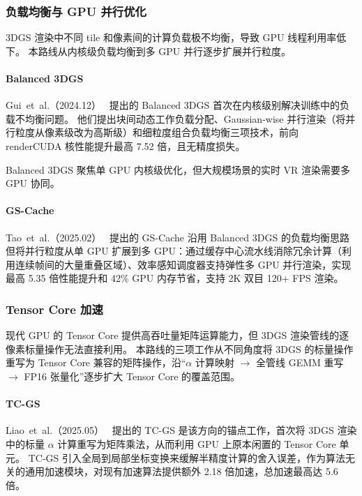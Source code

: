 \subsubsection{负载均衡与 GPU 并行优化}

3DGS 渲染中不同 tile 和像素间的计算负载极不均衡，导致 GPU 线程利用率低下。
本路线从内核级负载均衡到多 GPU 并行逐步扩展并行粒度。

\paragraph{Balanced 3DGS}
Gui~et~al.（2024.12）~\cite{2412_17378} 提出的 Balanced 3DGS 首次在内核级别解决训练中的负载不均衡问题。
他们提出块间动态工作负载分配、Gaussian-wise 并行渲染（将并行粒度从像素级改为高斯级）和细粒度组合负载均衡三项技术，前向 renderCUDA 核性能提升最高 7.52 倍，且无精度损失。

Balanced 3DGS 聚焦单 GPU 内核级优化，但大规模场景的实时 VR 渲染需要多 GPU 协同。
\paragraph{GS-Cache}

Tao~et~al.（2025.02）~\cite{2502_14938} 提出的 GS-Cache 沿用 Balanced 3DGS 的负载均衡思路但将并行粒度从单 GPU 扩展到多 GPU：通过缓存中心流水线消除冗余计算（利用连续帧间的大量重叠区域）、效率感知调度器支持弹性多 GPU 并行渲染，实现最高 5.35 倍性能提升和 42\% GPU 内存节省，支持 2K 双目 120+ FPS 渲染。

\subsubsection{Tensor Core 加速}

现代 GPU 的 Tensor Core 提供高吞吐量矩阵运算能力，但 3DGS 渲染管线的逐像素标量操作无法直接利用。
本路线的三项工作从不同角度将 3DGS 的标量操作重写为 Tensor Core 兼容的矩阵操作，沿“$\alpha$ 计算映射 $\to$ 全管线 GEMM 重写 $\to$ FP16 张量化”逐步扩大 Tensor Core 的覆盖范围。

\paragraph{TC-GS}
Liao~et~al.（2025.05）~\cite{2505_24796} 提出的 TC-GS 是该方向的锚点工作，首次将 3DGS 渲染中的标量 $\alpha$ 计算重写为矩阵乘法，从而利用 GPU 上原本闲置的 Tensor Core 单元。
TC-GS 引入全局到局部坐标变换来缓解半精度计算的舍入误差，作为算法无关的通用加速模块，对现有加速算法提供额外 2.18 倍加速，总加速最高达 5.6 倍。

